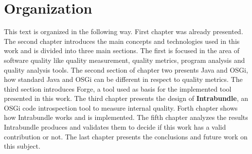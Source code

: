  
\section{Organization}

This text is organized in the following way. First chapter was already presented. The second chapter introduces the main concepts and technologies used in this work and is divided into three main sections. The first is focused in the area of software quality like quality measurement, quality metrics, program analysis and quality analysis tools. The second section of chapter two presents Java and OSGi, how standard Java and OSGi can be different in respect to quality metrics. The third section introduces Forge, a tool used as basis for the implemented tool presented in this work. The third chapter presents the design of \textbf{Intrabundle}, an OSGi code introspection tool to measure internal quality. Forth chapter shows how Intrabundle works and is implemented. The fifth chapter analyzes the results Intrabundle produces and validates them to decide if this work has a valid contribution or not. The last chapter presents the conclusions and future work on this subject.